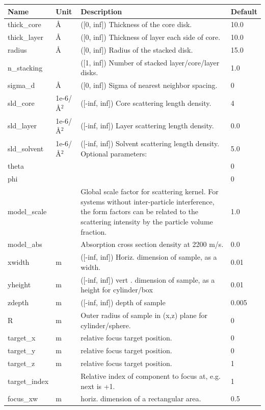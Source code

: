 \begin{longtable}{p{}p{}p{}p{}}
\toprule
\textbf{Name} & \textbf{Unit} & \textbf{Description} & \textbf{Default} \\
\midrule
\endhead
thick\_core & \AA{} & ([0, inf]) Thickness of the core disk. & 10.0 \\
thick\_layer & \AA{} & ([0, inf]) Thickness of layer each side of core. & 10.0 \\
radius & \AA{} & ([0, inf]) Radius of the stacked disk. & 15.0 \\
n\_stacking &  & ([1, inf]) Number of stacked layer/core/layer disks. & 1.0 \\
sigma\_d & \AA{} & ([0, inf]) Sigma of nearest neighbor spacing. & 0 \\
sld\_core & 1e-6/\AA{}$^{2}$ & ([-inf, inf]) Core scattering length density. & 4 \\
sld\_layer & 1e-6/\AA{}$^{2}$ & ([-inf, inf]) Layer scattering length density. & 0.0 \\
sld\_solvent & 1e-6/\AA{}$^{2}$ & ([-inf, inf]) Solvent scattering length density. Optional parameters: & 5.0 \\
theta &  &  & 0 \\
phi &  &  & 0 \\
model\_scale &   & Global scale factor for scattering kernel. For systems without inter-particle interference, the form factors can be related to the scattering intensity by the particle volume fraction. & 1.0 \\
model\_abs &   & Absorption cross section density at 2200 m/s. & 0.0 \\
xwidth & m & ([-inf, inf]) Horiz. dimension of sample, as a width. & 0.01 \\
yheight & m & ([-inf, inf]) vert . dimension of sample, as a height for cylinder/box & 0.01 \\
zdepth & m & ([-inf, inf]) depth of sample & 0.005 \\
R & m & Outer radius of sample in (x,z) plane for cylinder/sphere. & 0 \\
target\_x & m & relative focus target position. & 0 \\
target\_y & m & relative focus target position. & 0 \\
target\_z & m & relative focus target position. & 1 \\
target\_index &   & Relative index of component to focus at, e.g. next is +1. & 1 \\
focus\_xw & m & horiz. dimension of a rectangular area. & 0.5 \\

\end{longtable}

